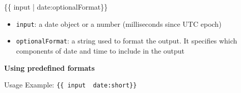 \documentclass[12pt,]{article}
\newenvironment{Shaded}{}{}
\newcommand{\NormalTok}[1]{{#1}}
\providecommand{\tightlist}{%
  \setlength{\itemsep}{0pt}\setlength{\parskip}{0pt}}
\begin{document}
\begin{Shaded}
\begin{Highlighting}[numbers=left,,]
\NormalTok{\{\{ input | date:optionalFormat\}\}}
\end{Highlighting}
\end{Shaded}

\begin{itemize}
\tightlist
\item
  \texttt{input}: a date object or a number (milliseconds since UTC
  epoch)
\item
  \texttt{optionalFormat}: a string used to format the output. It
  specifies which components of date and time to include in the output
\end{itemize}

\textbf{Using predefined formats}

Usage Example:
\texttt{\{\{\ input\ \textbar{}\ date:\textquotesingle{}short\textquotesingle{}\}\}}
\end{document}

